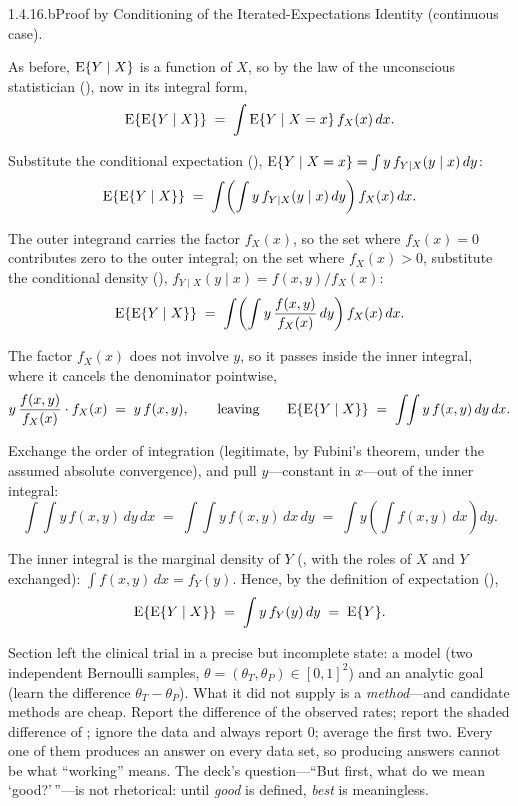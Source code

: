\documentclass[main.tex]{subfiles}
\begin{document}
\begin{Prf}{1.4.16.b}{Proof by Conditioning of the Iterated-Expectations Identity (continuous case).}{}
\item As before, $\mathrm{E}\{Y\mid X\}$ is a function of $X$, so by the law of the unconscious
      statistician (), now in its integral form,
      \[ \mathrm{E}\{\mathrm{E}\{Y\mid X\}\} \;=\; \int \mathrm{E}\{Y\mid X=x\}\,f_X(x)\,dx . \]
\item Substitute the conditional expectation (),
      $\mathrm{E}\{Y\mid X=x\}=\int y\,f_{Y\mid X}(y\mid x)\,dy$:
      \[ \mathrm{E}\{\mathrm{E}\{Y\mid X\}\}
         \;=\; \int\!\left(\int y\,f_{Y\mid X}(y\mid x)\,dy\right) f_X(x)\,dx . \]
\item The outer integrand carries the factor $f_X(x)$, so the set where $f_X(x)=0$
      contributes zero to the outer integral; on the set where $f_X(x)>0$, substitute the
      conditional density (), $f_{Y\mid X}(y\mid x)=f(x,y)/f_X(x)$:
      \[ \mathrm{E}\{\mathrm{E}\{Y\mid X\}\}
         \;=\; \int\!\left(\int y\,\frac{f(x,y)}{f_X(x)}\,dy\right) f_X(x)\,dx . \]
\item The factor $f_X(x)$ does not involve $y$, so it passes inside the inner integral, where
      it cancels the denominator pointwise,
      \[ y\,\frac{f(x,y)}{f_X(x)}\cdot f_X(x) \;=\; y\,f(x,y) ,
         \qquad\text{leaving}\qquad
         \mathrm{E}\{\mathrm{E}\{Y\mid X\}\} \;=\; \int\!\!\int y\,f(x,y)\,dy\,dx . \]
\item Exchange the order of integration (legitimate, by Fubini's theorem, under the assumed
      absolute convergence), and pull $y$---constant in $x$---out of the inner integral:
      \[ \int\!\!\int y\,f(x,y)\,dy\,dx \;=\; \int\!\!\int y\,f(x,y)\,dx\,dy
         \;=\; \int y\!\left(\int f(x,y)\,dx\right) dy . \]
\item The inner integral is the marginal density of $Y$ (, with the roles of $X$
      and $Y$ exchanged): $\int f(x,y)\,dx=f_Y(y)$. Hence, by the definition of expectation
      (),
      \[ \mathrm{E}\{\mathrm{E}\{Y\mid X\}\} \;=\; \int y\,f_Y(y)\,dy \;=\; \mathrm{E}\{Y\} . \]
\end{Prf}


Section  left the clinical trial in a precise but incomplete state: a model (two
independent Bernoulli samples, $\theta=(\theta_T,\theta_P)\in[0,1]^2$) and an analytic goal
(learn the difference $\theta_T-\theta_P$). What it did not supply is a \emph{method}---and
candidate methods are cheap. Report the difference of the observed rates; report the shaded
difference of ; ignore the data and always report $0$; average the first two. Every
one of them produces an answer on every data set, so producing answers cannot be what
``working'' means. The deck's question---``But first, what do we mean `good?'\,''---is not
rhetorical: until \emph{good} is defined, \emph{best} is meaningless.
\end{document}

